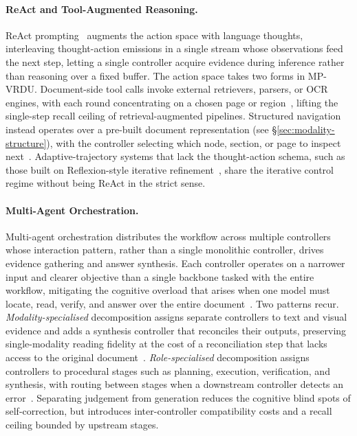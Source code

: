 \documentclass[11pt]{article}
\begin{document}
\paragraph{ReAct and Tool-Augmented Reasoning.}
ReAct prompting~\cite{yao2022react} augments the action space with language thoughts, interleaving thought-action emissions in a single stream whose observations feed the next step, letting a single controller acquire evidence during inference rather than reasoning over a fixed buffer. The action space takes two forms in MP-VRDU. Document-side tool calls invoke external retrievers, parsers, or OCR engines, with each round concentrating on a chosen page or region~\cite{sun2025docagent, wu2025docreact}, lifting the single-step recall ceiling of retrieval-augmented pipelines. Structured navigation instead operates over a pre-built document representation (see \S\ref{sec:modality-structure}), with the controller selecting which node, section, or page to inspect next~\cite{zheng2026docvstar}. Adaptive-trajectory systems that lack the thought-action schema, such as those built on Reflexion-style iterative refinement~\cite{jain2025simpledoc, fu2026dmap}, share the iterative control regime without being ReAct in the strict sense. 

\paragraph{Multi-Agent Orchestration.}
Multi-agent orchestration distributes the workflow across multiple controllers whose interaction pattern, rather than a single monolithic controller, drives evidence gathering and answer synthesis. Each controller operates on a narrower input and clearer objective than a single backbone tasked with the entire workflow, mitigating the cognitive overload that arises when one model must locate, read, verify, and answer over the entire document~\cite{yu2025mact}. Two patterns recur. \textit{Modality-specialised} decomposition assigns separate controllers to text and visual evidence and adds a synthesis controller that reconciles their outputs, preserving single-modality reading fidelity at the cost of a reconciliation step that lacks access to the original document~\cite{han2025mdocagent, duan2025m2rag}. \textit{Role-specialised} decomposition assigns controllers to procedural stages such as planning, execution, verification, and synthesis, with routing between stages when a downstream controller detects an error~\cite{yu2025mact, sun2025docagent}. Separating judgement from generation reduces the cognitive blind spots of self-correction, but introduces inter-controller compatibility costs and a recall ceiling bounded by upstream stages.
\end{document}
